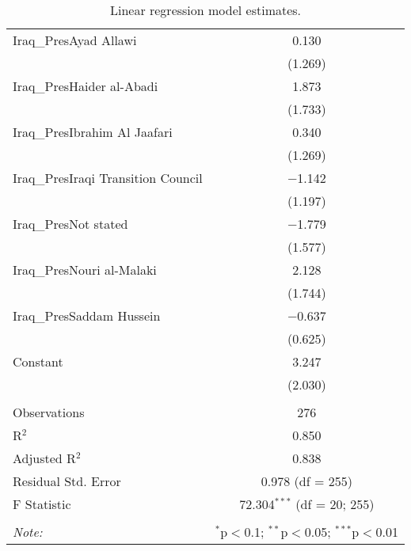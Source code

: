 \begin{table}[ht]
\begin{adjustbox}{width=1\textwidth}
\begin{tabular}{@{\extracolsep{5pt}}lc}
 Iraq\_PresAyad Allawi & 0.130 \\ 
  & (1.269) \\
 Iraq\_PresHaider al-Abadi & 1.873 \\ 
  & (1.733) \\
 Iraq\_PresIbrahim Al Jaafari & 0.340 \\ 
  & (1.269) \\
 Iraq\_PresIraqi Transition Council & $-$1.142 \\ 
  & (1.197) \\
 Iraq\_PresNot stated & $-$1.779 \\ 
  & (1.577) \\
 Iraq\_PresNouri al-Malaki & 2.128 \\ 
  & (1.744) \\
 Iraq\_PresSaddam Hussein & $-$0.637 \\ 
  & (0.625) \\
 Constant & 3.247 \\ 
  & (2.030) \\
\hline \\[-1.8ex] 
Observations & 276 \\ 
R$^{2}$ & 0.850 \\ 
Adjusted R$^{2}$ & 0.838 \\ 
Residual Std. Error & 0.978 (df = 255) \\ 
F Statistic & 72.304$^{***}$ (df = 20; 255) \\ 
\hline 
\hline \\[-1.8ex] 
\textit{Note:}  & \multicolumn{1}{r}{$^{*}$p$<$0.1; $^{**}$p$<$0.05; $^{***}$p$<$0.01} \\ 
\end{tabular} 
\end{adjustbox}
\caption{Linear regression model estimates.} 
\label{tab:linearreg} 
\end{table} 

